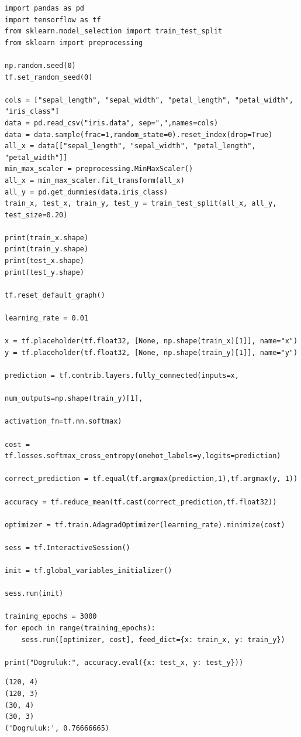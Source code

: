 \documentclass[12pt,fleqn]{article}\usepackage{../../common}
\begin{document}
\begin{verbatim}
import pandas as pd
import tensorflow as tf
from sklearn.model_selection import train_test_split
from sklearn import preprocessing

np.random.seed(0)
tf.set_random_seed(0)

cols = ["sepal_length", "sepal_width", "petal_length", "petal_width", "iris_class"]
data = pd.read_csv("iris.data", sep=",",names=cols)
data = data.sample(frac=1,random_state=0).reset_index(drop=True)
all_x = data[["sepal_length", "sepal_width", "petal_length", "petal_width"]]
min_max_scaler = preprocessing.MinMaxScaler()
all_x = min_max_scaler.fit_transform(all_x)
all_y = pd.get_dummies(data.iris_class)
train_x, test_x, train_y, test_y = train_test_split(all_x, all_y, test_size=0.20)

print(train_x.shape)
print(train_y.shape)
print(test_x.shape)
print(test_y.shape)

tf.reset_default_graph()

learning_rate = 0.01

x = tf.placeholder(tf.float32, [None, np.shape(train_x)[1]], name="x")
y = tf.placeholder(tf.float32, [None, np.shape(train_y)[1]], name="y")

prediction = tf.contrib.layers.fully_connected(inputs=x,
                                               num_outputs=np.shape(train_y)[1], 
                                               activation_fn=tf.nn.softmax)

cost = tf.losses.softmax_cross_entropy(onehot_labels=y,logits=prediction)

correct_prediction = tf.equal(tf.argmax(prediction,1),tf.argmax(y, 1))

accuracy = tf.reduce_mean(tf.cast(correct_prediction,tf.float32))

optimizer = tf.train.AdagradOptimizer(learning_rate).minimize(cost)

sess = tf.InteractiveSession()

init = tf.global_variables_initializer()

sess.run(init)

training_epochs = 3000
for epoch in range(training_epochs):
    sess.run([optimizer, cost], feed_dict={x: train_x, y: train_y})

print("Dogruluk:", accuracy.eval({x: test_x, y: test_y}))    
\end{verbatim}

\begin{verbatim}
(120, 4)
(120, 3)
(30, 4)
(30, 3)
('Dogruluk:', 0.76666665)
\end{verbatim}
\end{document}
